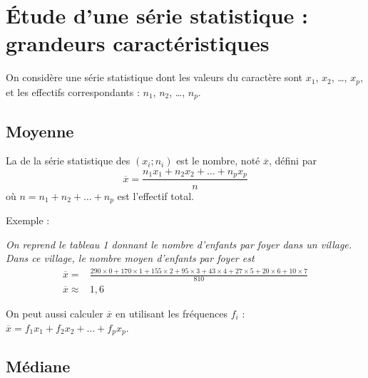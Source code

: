 \renewcommand{\exe}[1]{\par %
  \noindent%
  \fontfamily{cmss}\selectfont Exemple : \  \normalfont%
  \begin{minipage}[t]{0.85\linewidth}%
    \textit{#1}%
  \end{minipage} \par%
  \medskip
}

\section{Étude d'une série statistique : grandeurs caractéristiques}

On considère une série statistique dont les valeurs du caractère sont
$x_1$, $x_2$, {\ldots}, $x_p$, et les effectifs correspondants :
$n_1$, $n_2$, {\ldots}, $n_p$.



\subsection{Moyenne}

\begin{definition}
    La  de la série statistique des $(x_i;n_i)$ est le
  nombre, noté $\overline{x}$, défini par
  \[
  \overline{x} =
  \frac{n_1x_1+n_2x_2+{\ldots}+n_px_p}{n} 
  \]
  où $n = n_1+n_2+{\ldots}+n_p$ est l'effectif total.

    
\end{definition}

\bigskip


\exe{On reprend le tableau 1 donnant le nombre d'enfants par foyer
  dans un village. Dans ce village, le nombre moyen d'enfants par
  foyer est  
\begin{align*}
  \overline{x} = {} & 
  \frac{290\times0+170\times1+155\times2+95\times
    3+43\times 4+27\times 5+20\times 6+10\times 7}{810}
  \\[1ex]
  \overline{x} \approx {} & 1,6
\end{align*}
}
\medskip

\begin{remark}
On peut aussi calculer $\overline{x}$ en utilisant les fréquences
  $f_i$ : \\[1ex]
  $ \overline{x} = f_1 x_1 + f_2x_2+{\ldots}+f_px_p $. 

    
\end{remark}

\subsection{Médiane}

